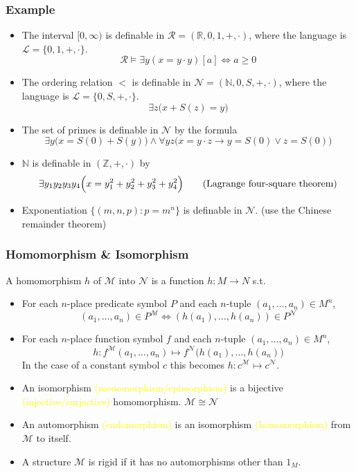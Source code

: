 \documentclass[UTF8,aspectratio=43,11pt,colorlinks,compress,openany]{beamer}%
\begin{document}
\begin{frame}\frametitle{Example}
	\begin{itemize}
		\item The interval $[0,\infty)$ is definable in $\mathcal{R}=(\mathbb{R},0,1,+,\cdot)$, where the language is $\mathscr{L}=\{0,1,+,\cdot\}$.
		\[\mathcal{R}\vDash\exists y(x=y\cdot y)[a]\iff a\geq 0\]
		\item The ordering relation $<$ is definable in $\mathcal{N}=(\mathbb{N},0,S,+,\cdot)$, where the language is $\mathscr{L}=\{0,S,+,\cdot\}$.
		\[\exists z\bigl(x+S(z)=y\bigr)\]
		\item The set of primes is definable in $\mathcal{N}$ by the formula
		\[\exists y\bigl(x=S(0)+S(y)\bigr)\wedge\forall yz\bigl(x=y\cdot z\to y=S(0)\vee z=S(0)\bigr)\]
		\item $\mathbb{N}$ is definable in $(\mathbb{Z},+,\cdot)$ by
		\[\exists y_1y_2y_3y_4\Big(x=y_1^2+y_2^2+y_3^2+y_4^2\Big)\tag{\text{Lagrange four-square theorem}}\]
		\item Exponentiation $\big\{(m,n,p): p=m^n\big\}$ is definable in $\mathcal{N}$. (use the Chinese remainder theorem)
	\end{itemize}
\end{frame}

\begin{frame}\frametitle{Homomorphism \& Isomorphism}
\setlength\abovedisplayskip{0pt}
\setlength\belowdisplayskip{0pt}
	\begin{definition}[Homomorphism]
		A homomorphism $h$ of $\mathcal{M}$ into $\mathcal{N}$ is a function $h: M\to N$ s.t.
		\begin{itemize}
			\item For each $n$-place predicate symbol $P$ and each $n$-tuple $(a_1,\dots,a_n)\in M^n$,
			\[(a_1,\dots,a_n)\in P^{\mathcal{M}}\iff(h(a_1),\dots,h(a_n))\in P^{\mathcal{N}}\]
			\item For each $n$-place function symbol $f$ and each $n$-tuple $(a_1,\dots,a_n)\in M^n$,
			\[h: f^{\mathcal{M}}(a_1,\dots,a_n)\mapsto f^{\mathcal{N}}\bigl(h(a_1),\dots,h(a_n)\bigr)\]
			In the case of a constant symbol $c$ this becomes $h: c^{\mathcal{M}}\mapsto c^{\mathcal{N}}$.
		\end{itemize}
	\end{definition}
	\begin{itemize}
		\item An isomorphism \textcolor{yellow}{(monomorphism/epimorphism)} is a bijective \textcolor{yellow}{(injective/surjective)} homomorphism. $\mathcal{M}\cong\mathcal{N}$
		\item An automorphism \textcolor{yellow}{(endomorphism)} is an isomorphism \textcolor{yellow}{(homomorphism)} from $\mathcal{M}$ to itself.
		\item A structure $\mathcal{M}$ is rigid if it has no automorphisms other than $1_M$.
	\end{itemize}
\end{frame}
\end{document}
